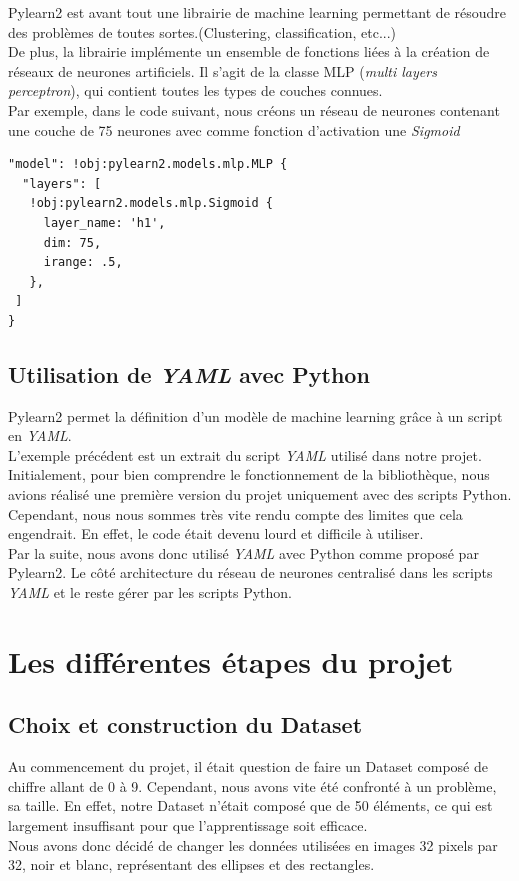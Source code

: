 \documentclass[12pt, a4paper]{article}
\begin{document}
Pylearn2 est avant tout une librairie de machine learning permettant de résoudre des problèmes de toutes sortes.(Clustering, classification, etc...)
\\De plus, la librairie implémente un ensemble de fonctions liées à la création de réseaux de neurones artificiels. Il s'agit de la classe MLP (\emph{multi layers perceptron}), qui contient toutes les types de couches connues. \\ Par exemple, dans le code suivant, nous créons un réseau de neurones contenant une couche de 75 neurones avec comme fonction d'activation une \emph{Sigmoid}
\begin{verbatim}
"model": !obj:pylearn2.models.mlp.MLP {
  "layers": [
   !obj:pylearn2.models.mlp.Sigmoid {
     layer_name: 'h1',
     dim: 75,
     irange: .5,
   },
 ]
}
\end{verbatim}
\subsection{Utilisation de \emph{YAML} avec Python}
Pylearn2 permet la définition d'un modèle de machine learning grâce à un script en \emph{YAML}.\\ L'exemple précédent est un extrait du script \emph{YAML} utilisé dans notre projet. 
\\

Initialement, pour bien comprendre le fonctionnement de la bibliothèque, nous avions réalisé une première version du projet uniquement avec des scripts Python. 
\\ Cependant, nous nous sommes très vite rendu compte des limites que cela engendrait. En effet, le code était devenu lourd et difficile à utiliser. 
\\

Par la suite, nous avons donc utilisé \emph{YAML} avec Python comme proposé par Pylearn2. Le côté architecture du réseau de neurones centralisé dans les scripts \emph{YAML} et le reste gérer par les scripts Python. 

\section{Les différentes étapes du projet}
	\subsection{Choix et construction du Dataset}
Au commencement du projet, il était question de faire un Dataset composé de chiffre allant de 0 à 9. 
Cependant, nous avons vite été confronté à un problème, sa taille. En effet, notre Dataset n'était composé que de 50 éléments, ce qui est largement insuffisant pour que l'apprentissage soit efficace.
\\ Nous avons donc décidé de changer les données utilisées en images 32 pixels par 32, noir et blanc, représentant des ellipses et des rectangles.
 
\end{document}
